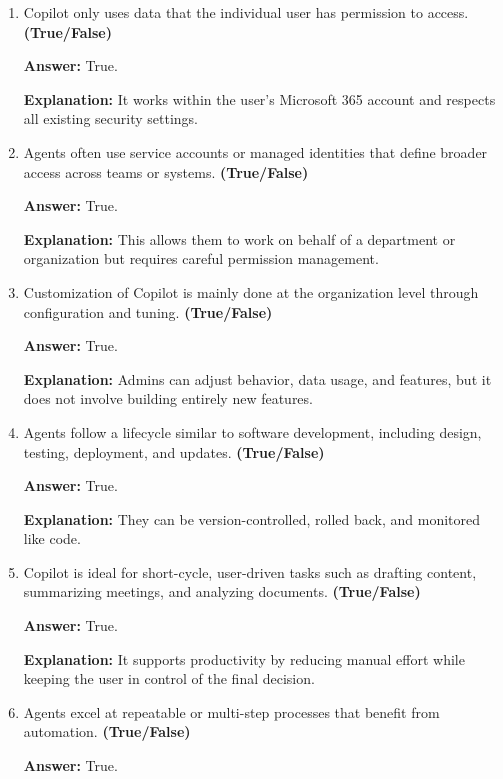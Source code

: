 \documentclass[10pt]{article}
\begin{document}
\begin{enumerate}[leftmargin=*]
\textbf{Answer:} True.

\textbf{Explanation:} They can complete multi-step processes and include dashboards or logs for tracking.

\item Copilot only uses data that the individual user has permission to access. \textbf{(True/False)}

\textbf{Answer:} True.

\textbf{Explanation:} It works within the user’s Microsoft 365 account and respects all existing security settings.

\item Agents often use service accounts or managed identities that define broader access across teams or systems. \textbf{(True/False)}

\textbf{Answer:} True.

\textbf{Explanation:} This allows them to work on behalf of a department or organization but requires careful permission management.

\item Customization of Copilot is mainly done at the organization level through configuration and tuning. \textbf{(True/False)}

\textbf{Answer:} True.

\textbf{Explanation:} Admins can adjust behavior, data usage, and features, but it does not involve building entirely new features.

\item Agents follow a lifecycle similar to software development, including design, testing, deployment, and updates. \textbf{(True/False)}

\textbf{Answer:} True.

\textbf{Explanation:} They can be version-controlled, rolled back, and monitored like code.

\item Copilot is ideal for short-cycle, user-driven tasks such as drafting content, summarizing meetings, and analyzing documents. \textbf{(True/False)}

\textbf{Answer:} True.

\textbf{Explanation:} It supports productivity by reducing manual effort while keeping the user in control of the final decision.

\item Agents excel at repeatable or multi-step processes that benefit from automation. \textbf{(True/False)}

\textbf{Answer:} True.


\end{enumerate}
\end{document}
